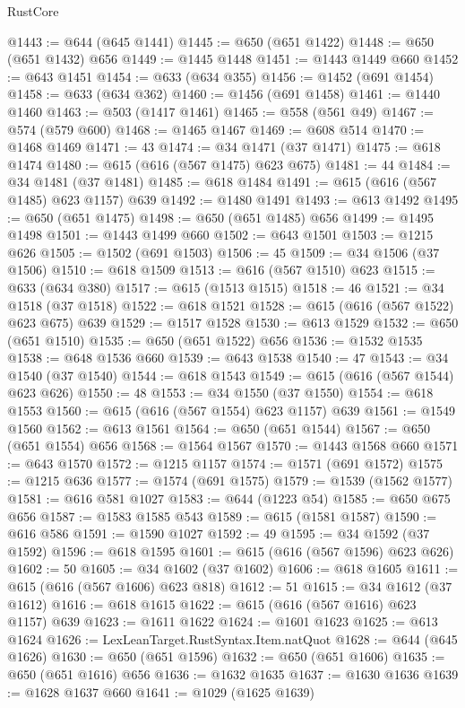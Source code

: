 \begin{lexlean}{RustCore}
\begin{coremodule}
@1443 := @644 (@645 @1441)
@1445 := @650 (@651 @1422)
@1448 := @650 (@651 @1432) @656
@1449 := @1445 @1448
@1451 := @1443 @1449 @660
@1452 := @643 @1451
@1454 := @633 (@634 @355)
@1456 := @1452 (@691 @1454)
@1458 := @633 (@634 @362)
@1460 := @1456 (@691 @1458)
@1461 := @1440 @1460
@1463 := @503 (@1417 @1461)
@1465 := @558 (@561 @49)
@1467 := @574 (@579 @600)
@1468 := @1465 @1467
@1469 := @608 @514
@1470 := @1468 @1469
@1471 := 43
@1474 := @34 @1471 (@37 @1471)
@1475 := @618 @1474
@1480 := @615 (@616 (@567 @1475) @623 @675)
@1481 := 44
@1484 := @34 @1481 (@37 @1481)
@1485 := @618 @1484
@1491 := @615 (@616 (@567 @1485) @623 @1157) @639
@1492 := @1480 @1491
@1493 := @613 @1492
@1495 := @650 (@651 @1475)
@1498 := @650 (@651 @1485) @656
@1499 := @1495 @1498
@1501 := @1443 @1499 @660
@1502 := @643 @1501
@1503 := @1215 @626
@1505 := @1502 (@691 @1503)
@1506 := 45
@1509 := @34 @1506 (@37 @1506)
@1510 := @618 @1509
@1513 := @616 (@567 @1510) @623
@1515 := @633 (@634 @380)
@1517 := @615 (@1513 @1515)
@1518 := 46
@1521 := @34 @1518 (@37 @1518)
@1522 := @618 @1521
@1528 := @615 (@616 (@567 @1522) @623 @675) @639
@1529 := @1517 @1528
@1530 := @613 @1529
@1532 := @650 (@651 @1510)
@1535 := @650 (@651 @1522) @656
@1536 := @1532 @1535
@1538 := @648 @1536 @660
@1539 := @643 @1538
@1540 := 47
@1543 := @34 @1540 (@37 @1540)
@1544 := @618 @1543
@1549 := @615 (@616 (@567 @1544) @623 @626)
@1550 := 48
@1553 := @34 @1550 (@37 @1550)
@1554 := @618 @1553
@1560 := @615 (@616 (@567 @1554) @623 @1157) @639
@1561 := @1549 @1560
@1562 := @613 @1561
@1564 := @650 (@651 @1544)
@1567 := @650 (@651 @1554) @656
@1568 := @1564 @1567
@1570 := @1443 @1568 @660
@1571 := @643 @1570
@1572 := @1215 @1157
@1574 := @1571 (@691 @1572)
@1575 := @1215 @636
@1577 := @1574 (@691 @1575)
@1579 := @1539 (@1562 @1577)
@1581 := @616 @581 @1027
@1583 := @644 (@1223 @54)
@1585 := @650 @675 @656
@1587 := @1583 @1585 @543
@1589 := @615 (@1581 @1587)
@1590 := @616 @586
@1591 := @1590 @1027
@1592 := 49
@1595 := @34 @1592 (@37 @1592)
@1596 := @618 @1595
@1601 := @615 (@616 (@567 @1596) @623 @626)
@1602 := 50
@1605 := @34 @1602 (@37 @1602)
@1606 := @618 @1605
@1611 := @615 (@616 (@567 @1606) @623 @818)
@1612 := 51
@1615 := @34 @1612 (@37 @1612)
@1616 := @618 @1615
@1622 := @615 (@616 (@567 @1616) @623 @1157) @639
@1623 := @1611 @1622
@1624 := @1601 @1623
@1625 := @613 @1624
@1626 := LexLeanTarget.RustSyntax.Item.natQuot
@1628 := @644 (@645 @1626)
@1630 := @650 (@651 @1596)
@1632 := @650 (@651 @1606)
@1635 := @650 (@651 @1616) @656
@1636 := @1632 @1635
@1637 := @1630 @1636
@1639 := @1628 @1637 @660
@1641 := @1029 (@1625 @1639)

\end{coremodule}
\end{lexlean}

